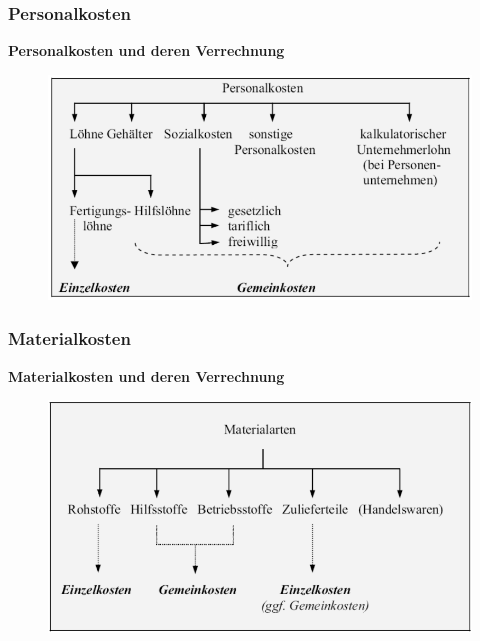 \documentclass[a4paper,11pt, twoside]{article}
\begin{document}
\subsubsection*{Personalkosten}
\textbf{Personalkosten und deren Verrechnung}
\begin{figure}[h]
 \begin{center}
   \includegraphics[scale=0.3]{bilder/personalkosten.png}
 \end{center}
\end{figure}

\subsubsection*{Materialkosten}
\textbf{Materialkosten und deren Verrechnung}
\begin{figure}[h]
 \begin{center}
   \includegraphics[scale=0.3]{bilder/materialkosten.png}
 \end{center}
\end{figure}
\end{document}
